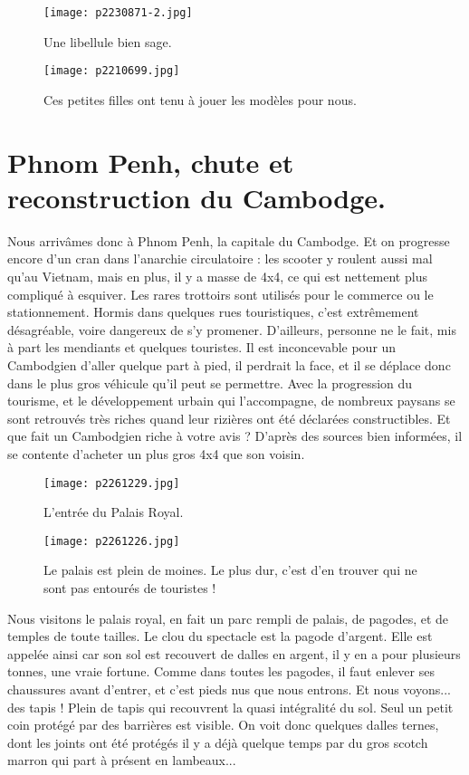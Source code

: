\documentclass{book}
\begin{document}
\begin{figure}[h]
\centering
\texttt{[image: p2230871-2.jpg]}
\caption*{Une libellule bien sage.}
\end{figure}


\begin{figure}[h]
\centering
\texttt{[image: p2210699.jpg]}
\caption*{Ces petites filles ont tenu à jouer les modèles pour nous.}
\end{figure}



\chapter{Phnom Penh, chute et reconstruction du Cambodge.}
Nous arrivâmes donc à Phnom Penh, la capitale du Cambodge. Et on progresse encore d'un cran dans l'anarchie circulatoire : les scooter y roulent aussi mal qu'au Vietnam, mais en plus, il y a masse de 4x4, ce qui est nettement plus compliqué à esquiver. Les rares trottoirs sont utilisés pour le commerce ou le stationnement. Hormis dans quelques rues touristiques, c'est extrêmement désagréable, voire dangereux de s'y promener. D'ailleurs, personne ne le fait, mis à part les mendiants et quelques touristes. Il est inconcevable pour un Cambodgien d'aller quelque part à pied, il perdrait la face, et il se déplace donc dans le plus gros véhicule qu'il peut se permettre. Avec la progression du tourisme, et le développement urbain qui l'accompagne, de nombreux paysans se sont retrouvés très riches quand leur rizières ont été déclarées constructibles. Et que fait un Cambodgien riche à votre avis ? D'après des sources bien informées, il se contente d'acheter un plus gros 4x4 que son voisin.


\begin{figure}[h]
\centering
\texttt{[image: p2261229.jpg]}
\caption*{L'entrée du Palais Royal.}
\end{figure}




\begin{figure}[h]
\centering
\texttt{[image: p2261226.jpg]}
\caption*{Le palais est plein de moines. Le plus dur, c'est d'en trouver qui ne sont pas entourés de touristes !}
\end{figure}

Nous visitons le palais royal, en fait un parc rempli de palais, de pagodes, et de temples de toute tailles. Le clou du spectacle est la pagode d'argent. Elle est appelée ainsi car son sol est recouvert de dalles en argent, il y en a pour plusieurs tonnes, une vraie fortune. Comme dans toutes les pagodes, il faut enlever ses chaussures avant d'entrer, et c'est pieds nus que nous entrons. Et nous voyons... des tapis ! Plein de tapis qui recouvrent la quasi intégralité du sol. Seul un petit coin protégé par des barrières est visible. On voit donc quelques dalles ternes, dont les joints ont été protégés il y a déjà quelque temps par du gros scotch marron qui part à présent en lambeaux...
\end{document}
